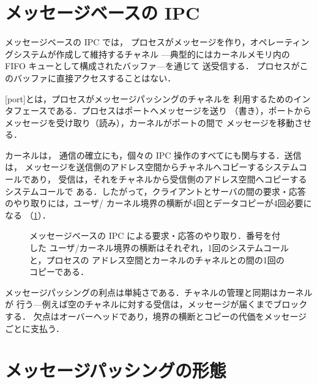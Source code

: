 \documentclass[../main.tex]{subfiles}
\begin{document}
\section{メッセージベースの IPC}
\label{sec:l09-message}

メッセージベースの IPC では，
プロセスがメッセージを作り，オペレーティングシステムが作成して維持するチャネル
---典型的にはカーネルメモリ内の FIFO キューとして構成されたバッファ---を通じて
送受信する．
プロセスがこのバッファに直接アクセスすることはない．

\begin{definition}[ポート]
  [port]とは，プロセスがメッセージパッシングのチャネルを
  利用するためのインタフェースである．プロセスはポートへメッセージを送り
  （書き），ポートからメッセージを受け取り（読み），カーネルがポートの間で
  メッセージを移動させる．
\end{definition}

カーネルは，%
通信の確立にも，個々の IPC 操作のすべてにも関与する．送信は，
メッセージを送信側のアドレス空間からチャネルへコピーするシステムコールであり，
受信は，それをチャネルから受信側のアドレス空間へコピーするシステムコールで
ある．したがって，クライアントとサーバの間の要求・応答のやり取りには，ユーザ/
カーネル境界の横断が4回とデータコピーが4回必要になる
（\cref{fig:l09-message-ipc}）．

\begin{figure}[htbp]
  \centering
  
  \caption{メッセージベースの IPC による要求・応答のやり取り．番号を付した
    ユーザ/カーネル境界の横断はそれぞれ，1回のシステムコールと，プロセスの
    アドレス空間とカーネルのチャネルとの間の1回のコピーである．}
  \label{fig:l09-message-ipc}
\end{figure}

メッセージパッシングの利点は単純さである．チャネルの管理と同期はカーネルが
行う---例えば空のチャネルに対する受信は，メッセージが届くまでブロックする．
欠点はオーバーヘッドであり，境界の横断とコピーの代価をメッセージごとに支払う．

\section{メッセージパッシングの形態}
\label{sec:l09-forms}
\end{document}
